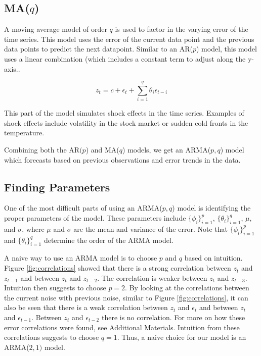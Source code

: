 \subsection*{MA($q$)}

A moving average model of order $q$ is used to factor in the varying error of the time series.
This model uses the error of the current data point and the previous data points to predict the next datapoint.
Similar to an AR($p$) model, this model uses a linear combination (which includes a constant term to adjust along the y-axis..

\begin{equation}
z_t = c + \epsilon_t + \sum_{i=1}^q\theta_i\epsilon_{t-i}
\label{eq:MA}
\end{equation}

This part of the model simulates shock effects in the time series.
Examples of shock effects include volatility in the stock market or sudden cold fronts in the temperature.

Combining both the AR$(p$) and MA($q$) models, we get an ARMA($p,q$) model which forecasts based on previous observations and error trends in the data.

\subsection*{Finding Parameters}

One of the most difficult parts of using an ARMA($p,q$) model is identifying the proper parameters of the model.
These parameters include $\{\phi_i\}_{i=1}^p$, $\{\theta_i\}_{i=1}^q$, $\mu$, and $\sigma$, where $\mu$ and $\sigma$ are the mean and variance of the error.
Note that $\{\phi_i\}_{i=1}^p$ and $\{\theta_i\}_{i=1}^q$ determine the order of the ARMA model.

A naive way to use an ARMA model is to choose $p$ and $q$ based on intuition.
Figure \ref{fig:correlations} showed that there is a strong correlation between $z_t$ and $z_{t-1}$ and between $z_t$ and $z_{t-2}$.
The correlation is weaker between $z_t$ and $z_{t-3}$.
Intuition then suggests to choose $p=2$.
By looking at the correlations between the current noise with previous noise, similar to Figure \ref{fig:correlations}, it can also be seen that there is a weak correlation between $z_t$ and $\epsilon_t$ and between $z_t$ and $\epsilon_{t-1}$.
Between $z_t$ and $\epsilon_{t-2}$ there is no correlation.
For more on how these error correlations were found, see Additional Materials.
Intuition from these correlations suggests to choose $q=1$.
Thus, a naive choice for our model is an ARMA($2,1)$ model.

